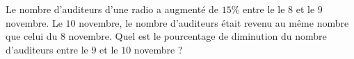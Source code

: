 
\begin{exercice}\label{exosmath-0080}

    Le nombre d'auditeurs d'une radio a augmenté de \( 15\%\) entre le le \( 8\) et le \( 9\) novembre. Le \( 10\) novembre, le nombre d'auditeurs était revenu au même nombre que celui du \( 8\) novembre. Quel est le pourcentage de diminution du nombre d'auditeurs entre le \( 9\) et le \( 10\) novembre ?

\end{exercice}
